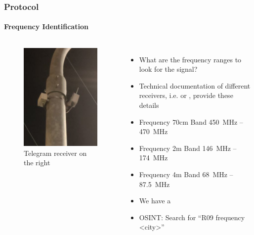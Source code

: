 \begin{frame}
\frametitle{Protocol}
\framesubtitle{Frequency Identification}
\begin{columns}
\centering
\begin{figure}
	\centering
	\includegraphics[width=\textwidth]{figs/lsa-antenna.png}
	\caption{Telegram receiver on the right}
\end{figure}
\begin{itemize}
		\item What are the frequency ranges to look for the signal?
		\item Technical documentation of different receivers, i.e.  or , provide these details
		\item Frequency 70cm Band \SI{450}{\MHz} -- \SI{470}{\MHz}		
		\item Frequency 2m Band \SI{146}{\MHz} -- \SI{174}{\MHz}
		\item Frequency 4m Band \SI{68}{\MHz} -- \SI{87.5}{\MHz}
		\item We have a 
		\item OSINT: Search for ``R09 frequency <city>''
\end{itemize}
\end{columns}
\end{frame}

